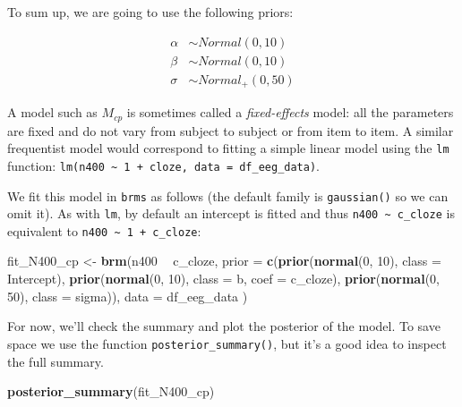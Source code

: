 \documentclass[12pt,]{krantz}
\newenvironment{Shaded}{\begin{snugshade}}{\end{snugshade}}
\newcommand{\KeywordTok}[1]{\textcolor[rgb]{0.13,0.29,0.53}{\textbf{#1}}}
\newcommand{\DataTypeTok}[1]{\textcolor[rgb]{0.13,0.29,0.53}{#1}}
\newcommand{\DecValTok}[1]{\textcolor[rgb]{0.00,0.00,0.81}{#1}}
\newcommand{\StringTok}[1]{\textcolor[rgb]{0.31,0.60,0.02}{#1}}
\newcommand{\OperatorTok}[1]{\textcolor[rgb]{0.81,0.36,0.00}{\textbf{#1}}}
\newcommand{\NormalTok}[1]{#1}
\theoremstyle{definition}
\theoremstyle{definition}
\theoremstyle{definition}
\theoremstyle{remark}
\begin{document}
To sum up, we are going to use the following priors:

\begin{equation}
 \begin{aligned}
 \alpha &\sim Normal(0,10)\\
 \beta  &\sim Normal(0,10)\\
 \sigma  &\sim Normal_{+}(0,50)
 \end{aligned}
 \end{equation}

A model such as \(M_{cp}\) is sometimes called a \emph{fixed-effects}
model: all the parameters are fixed and do not vary from subject to
subject or from item to item. A similar frequentist model would
correspond to fitting a simple linear model using the \texttt{lm}
function:
\texttt{lm(n400\ \textasciitilde{}\ 1\ +\ cloze,\ data\ =\ df\_eeg\_data)}.

We fit this model in \texttt{brms} as follows (the default family is
\texttt{gaussian()} so we can omit it). As with \texttt{lm}, by default
an intercept is fitted and thus
\texttt{n400\ \textasciitilde{}\ c\_cloze} is equivalent to
\texttt{n400\ \textasciitilde{}\ 1\ +\ c\_cloze}:

\begin{Shaded}
\begin{Highlighting}[]
\NormalTok{fit_N400_cp <-}\StringTok{ }\KeywordTok{brm}\NormalTok{(n400 }\OperatorTok{~}\StringTok{ }\NormalTok{c_cloze,}
  \DataTypeTok{prior =} 
    \KeywordTok{c}\NormalTok{(}\KeywordTok{prior}\NormalTok{(}\KeywordTok{normal}\NormalTok{(}\DecValTok{0}\NormalTok{, }\DecValTok{10}\NormalTok{), }\DataTypeTok{class =}\NormalTok{ Intercept),}
      \KeywordTok{prior}\NormalTok{(}\KeywordTok{normal}\NormalTok{(}\DecValTok{0}\NormalTok{, }\DecValTok{10}\NormalTok{), }\DataTypeTok{class =}\NormalTok{ b, }\DataTypeTok{coef =}\NormalTok{ c_cloze),}
      \KeywordTok{prior}\NormalTok{(}\KeywordTok{normal}\NormalTok{(}\DecValTok{0}\NormalTok{, }\DecValTok{50}\NormalTok{), }\DataTypeTok{class =}\NormalTok{ sigma)),}
  \DataTypeTok{data =}\NormalTok{ df_eeg_data}
\NormalTok{)}
\end{Highlighting}
\end{Shaded}

For now, we'll check the summary and plot the posterior of the model. To
save space we use the function \texttt{posterior\_summary()}, but it's a
good idea to inspect the full summary.

\begin{Shaded}
\begin{Highlighting}[]
\KeywordTok{posterior_summary}\NormalTok{(fit_N400_cp)}
\end{Highlighting}
\end{Shaded}
\end{document}
